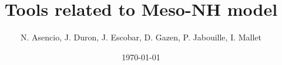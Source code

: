 \documentclass[12pt]{article}
\begin{document}
%    
\newcommand{\ignore}[1]{}
%
%
\title {Tools related to Meso-NH model}
\author{N. Asencio, J. Duron, J. Escobar, D. Gazen, P. Jabouille, I. Mallet}
\date{\today}
\maketitle

\tableofcontents







\end{document}
